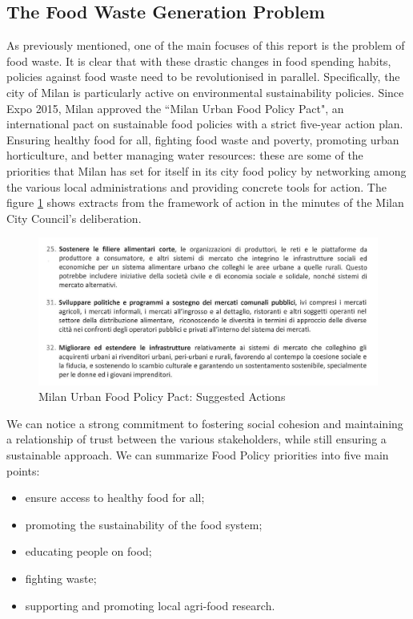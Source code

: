 \subsection{The Food Waste Generation Problem}

As previously mentioned, one of the main focuses of this report is the problem of food waste.
It is clear that with these drastic changes in food spending habits, policies against food waste need to be revolutionised in parallel.
Specifically, the city of Milan is particularly active on environmental sustainability policies.
Since Expo 2015, Milan approved the ``Milan Urban Food Policy Pact", an international pact on sustainable food policies with a strict five-year action plan. Ensuring healthy food for all, fighting food waste and poverty, promoting urban horticulture, and better managing water resources: these are some of the priorities that Milan has set for itself in its city food policy by networking among the various local administrations and providing concrete tools for action. The figure \ref{fig: policy} shows extracts from the framework of action in the minutes of the Milan City Council's deliberation.

\begin{figure}[h!]
  \centering
  \includegraphics[width=14cm]{figs/food policy.png}
  \caption{Milan Urban Food Policy Pact: Suggested Actions}
  \label{fig: policy}
\end{figure}

We can notice a strong commitment to fostering social cohesion and maintaining a relationship of trust between the various stakeholders, while still ensuring a sustainable approach. We can summarize Food Policy priorities into five main points:

\begin{itemize}
\item ensure access to healthy food for all;
\item promoting the sustainability of the food system;
\item educating people on food;
\item fighting waste;
\item supporting and promoting local agri-food research.
\end{itemize}

